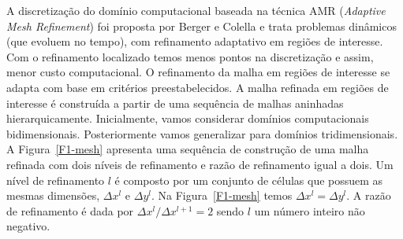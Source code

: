 \documentclass[12pt, brazil]{article}
\begin{document}
A discretização do domínio computacional baseada na técnica AMR ({\it Adaptive Mesh Refinement}) foi proposta por Berger e Colella \cite{BER91,BER84} e trata problemas dinâmicos (que evoluem no tempo), com refinamento adaptativo em regiões de interesse. Com o refinamento localizado temos menos pontos na discretização e assim, menor custo computacional. O refinamento da malha em regiões de interesse se adapta com base em critérios preestabelecidos. A malha refinada em regiões de interesse é construída a partir de uma sequência de malhas aninhadas hierarquicamente. Inicialmente, vamos considerar domínios computacionais bidimensionais. Posteriormente vamos generalizar para domínios tridimensionais. A Figura~\ref{F1-mesh} apresenta uma sequência de construção de uma malha refinada com dois níveis de refinamento e razão de refinamento igual a dois. Um nível de refinamento $l$ é composto por um conjunto de células que possuem as mesmas dimensões, $\Delta x^l$ e $\Delta y^l$. Na Figura~\ref{F1-mesh} temos $\Delta x^l = \Delta y^l$. A razão de refinamento é dada por $\Delta x^{l}/\Delta x^{l+1} = 2$ sendo $l$ um número inteiro não negativo. 
\end{document}
